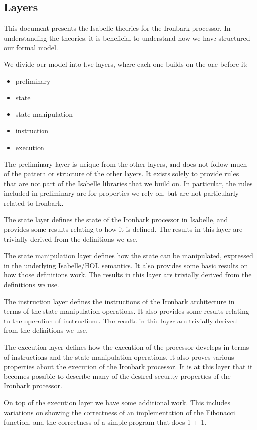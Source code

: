 \documentclass[11pt,a4paper]{article}
\begin{document}
\subsection{Layers}
This document presents the Isabelle theories for the Ironbark processor. In understanding the theories, it is beneficial to understand how we have structured our formal model.

We divide our model into five layers, where each one builds on the one before it:
\begin{itemize}
  \item preliminary
  \item state
  \item state manipulation
  \item instruction
  \item execution
\end{itemize}

The preliminary layer is unique from the other layers, and does not follow much of the pattern or structure of the other layers. It exists solely to provide rules that are not part of the Isabelle libraries that we build on. In particular, the rules included in preliminary are for properties we rely on, but are not particularly related to Ironbark.

The state layer defines the state of the Ironbark processor in Isabelle, and provides some results relating to how it is defined. The results in this layer are trivially derived from the definitions we use.

The state manipulation layer defines how the state can be manipulated, expressed in the underlying Isabelle/HOL semantics. It also provides some basic results on how those definitions work. The results in this layer are trivially derived from the definitions we use.

The instruction layer defines the instructions of the Ironbark architecture in terms of the state manipulation operations. It also provides some results relating to the operation of instructions. The results in this layer are trivially derived from the definitions we use.

The execution layer defines how the execution of the processor develops in terms of instructions and the state manipulation operations. It also proves various properties about the execution of the Ironbark processor. It is at this layer that it becomes possible to describe many of the desired security properties of the Ironbark processor.

On top of the execution layer we have some additional work. This includes variations on showing the correctness of an implementation of the Fibonacci function, and the correctness of a simple program that does 1 + 1.
\end{document}
